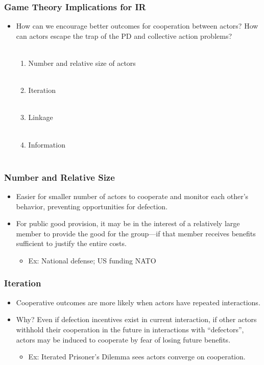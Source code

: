 \documentclass{beamer}
\begin{document}
\begin{frame} 
 \frametitle{\LARGE{Game Theory Implications for IR}}
 	\begin{itemize}
 		\item How can we encourage better outcomes for cooperation between actors? How can actors escape the trap of the PD and collective action problems? \pause \\~\\
 		\begin{enumerate}
 			\item Number and relative size of actors \pause \\~\\
 		    \item Iteration \pause \\~\\
 		    \item Linkage \pause  \\~\\
 		    \item Information  \\~\\
 		\end{enumerate}
 	\end{itemize}
 \end{frame}

\begin{frame} 
	\frametitle{\LARGE{Number and Relative Size}}
	\begin{itemize}
		\item Easier for smaller number of actors to cooperate and monitor each other’s behavior, preventing opportunities for defection. \pause
		\item For public good provision, it may be in the interest of a relatively large member to provide the good for the group—if that member receives benefits sufficient to justify the entire costs.
		\begin{itemize}
			\item Ex: National defense; US funding NATO
		\end{itemize}
	\end{itemize}
\end{frame}

\begin{frame} 
	\frametitle{\LARGE{Iteration}}
	\begin{itemize}
		\item Cooperative outcomes are more likely when actors have repeated interactions. \pause
		\item Why? Even if defection incentives exist in current interaction, if other actors withhold their cooperation in the future in interactions with “defectors”, actors may be induced to cooperate by fear of losing future benefits.
		\begin{itemize}
			\item Ex: Iterated Prisoner's Dilemma sees actors converge on cooperation.
		\end{itemize}
	\end{itemize}
\end{frame}
\end{document}
